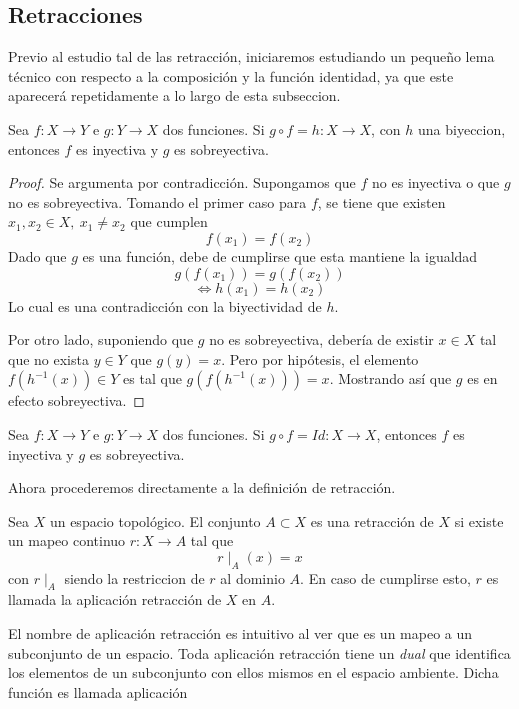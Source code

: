 \subsection{Retracciones}
Previo al estudio tal de las retracción, iniciaremos estudiando un
pequeño lema técnico con respecto a la composición y la función
identidad, ya que este aparecerá repetidamente a lo largo de esta
subseccion.
\begin{lema}
  Sea \(f : X \to Y\) e \(g : Y \to X\) dos funciones. Si \( g \circ f =
  h : X \to X \), con \(h\) una biyeccion, entonces \(f\) es inyectiva y
  \(g\) es sobreyectiva.
\end{lema}
\begin{proof}
  Se argumenta por contradicción. Supongamos que \(f\) no es inyectiva o
  que \(g\) no es sobreyectiva. Tomando el primer caso para \(f\), se
  tiene que existen \(x_1 , x_2 \in X,\ x_1 \neq x_2\) que cumplen
  \[ f (x_1) = f(x_2) \]
  Dado que \(g\) es una función, debe de cumplirse que esta mantiene la igualdad
  \[ g (f (x_1)) = g (f(x_2)) \]
  \[ \iff h (x_1) = h(x_2) \]
  Lo cual es una contradicción con la biyectividad de \(h\).

  Por otro lado, suponiendo que \(g\) no es sobreyectiva, debería de
  existir \(x \in X\) tal que no exista \( y \in Y\) que \(g (y) = x\).
  Pero por hipótesis, el elemento \(f(h^{-1}(x)) \in Y\) es tal que \(g
  (f (h^{-1}(x))) = x\). Mostrando así que \(g\) es en efecto
  sobreyectiva.
\end{proof}
\begin{corolario} \label{thm:comp-identidad}
  Sea \(f : X \to Y\) e \(g : Y \to X\) dos funciones. Si \( g \circ f =
  Id : X \to X \), entonces \(f\) es inyectiva y \(g\) es sobreyectiva.
\end{corolario}
\noindent Ahora procederemos directamente a la definición
de retracción.
\begin{definicion}[Retraccion]
  Sea \(X\) un espacio topológico. El conjunto \(A \subset X\) es una
  retracción de \(X\) si existe un mapeo continuo \(r : X \to A\) tal que
  \[ r \mid_{A} (x) = x \]
  con \(r \mid_{A}\) siendo la restriccion de \(r\) al dominio \(A\). En
  caso de cumplirse esto, \(r\) es llamada la aplicación retracción de
  \(X\) en \(A\).
\end{definicion}
\noindent El nombre de aplicación retracción es intuitivo al ver que es
un mapeo a un subconjunto de un espacio. Toda aplicación retracción
tiene un \emph{dual} que identifica los elementos de un subconjunto con
ellos mismos en el espacio ambiente. Dicha función es llamada aplicación
